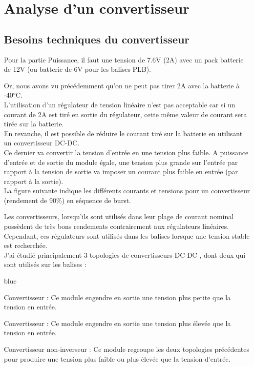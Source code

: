 \section{Analyse d'un convertisseur}

\subsection{Besoins techniques du convertisseur}


Pour la partie Puissance, il faut une tension de 7.6V (2A) avec un pack batterie de 12V (ou batterie de 6V pour les balises PLB). 

Or, nous avons vu précédemment qu'on ne peut pas tirer 2A avec la batterie à -40°C.\\
L'utilisation d'un régulateur de tension linéaire n'est pas acceptable car si un courant de 2A est tiré en sortie du régulateur, cette même valeur de courant sera tirée sur la batterie.\\

En revanche, il est possible de réduire le courant tiré sur la batterie en utilisant un convertisseur DC-DC.\\ Ce dernier va convertir la tension d'entrée en une tension plus faible. A puissance d'entrée et de sortie du module égale, une tension plus grande sur l'entrée par rapport à la tension de sortie va imposer un courant plus faible en entrée (par rapport à la sortie).\\
La figure suivante indique les différents courants et tensions pour un convertisseur (rendement de 90\%) en séquence de burst.\\




Les convertisseurs, lorsqu'ils sont utilisés dans leur plage de courant nominal possèdent de très bons rendements contrairement aux régulateurs linéaires. Cependant, ces régulateurs sont utilisés dans les balises lorsque une tension stable est recherchée.\\


J'ai étudié principalement 3 topologies de convertisseurs DC-DC , dont deux qui sont utilisés sur les balises :

\begin{items}{blue}{\Triangle}
    \item Convertisseur  : Ce module engendre en sortie une tension plus petite que la tension en entrée.
    \item Convertisseur  : Ce module engendre en sortie une tension plus élevée que la tension en entrée.
    \item Convertisseur  non-inverseur : Ce module regroupe les deux topologies précédentes pour produire une tension plus faible ou plus élevée que la tension d'entrée.
\end{items}


